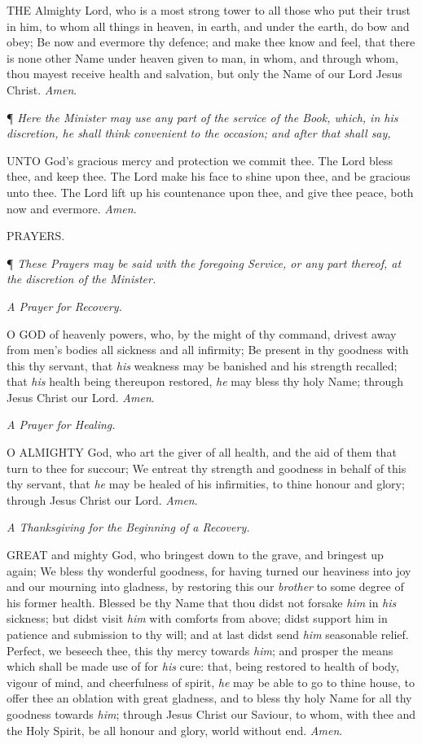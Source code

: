 THE
Almighty Lord, who is a most strong tower to all those who put their
trust in him, to whom all things in heaven, in earth, and under the
earth, do bow and obey; Be now and evermore thy defence; and make thee
know and feel, that there is none other Name under heaven given to man,
in whom, and through whom, thou mayest receive health and salvation,
but only the Name of our Lord Jesus Christ. \emph{Amen}.

¶
\emph{Here the Minister may use any part of the service of the Book, which,
in his discretion, he shall think convenient to the occasion; and after
that shall say,}

UNTO
God's gracious mercy and protection we commit thee. The Lord bless thee,
and keep thee. The Lord make his face to shine upon thee, and be gracious
unto thee. The Lord lift up his countenance upon thee, and give thee
peace, both now and evermore. \emph{Amen}.

PRAYERS.

¶ \emph{These Prayers may be said with the foregoing Service, or any
part thereof, at the discretion of the Minister.}

\emph{A
Prayer for Recovery.}

O
GOD of heavenly powers, who, by the might of thy command, drivest away
from men's bodies all sickness and all infirmity; Be present in thy goodness
with this thy servant, that \emph{his} weakness may be banished and
his strength recalled; that \emph{his} health being thereupon restored,
\emph{he} may bless thy holy Name; through Jesus Christ our Lord. \emph{Amen}.

\emph{A
Prayer for Healing.}

O
ALMIGHTY God, who art the giver of all health, and the aid of them that
turn to thee for succour; We entreat thy strength and goodness in behalf
of this thy servant, that \emph{he} may be healed of his infirmities,
to thine honour and glory; through Jesus Christ our Lord. \emph{Amen}.

\emph{A
Thanksgiving for the Beginning of a Recovery.}

GREAT
and mighty God, who bringest down to the grave, and bringest up again;
We bless thy wonderful goodness, for having turned our heaviness into
joy and our mourning into gladness, by restoring this our \emph{brother}
to some degree of his former health. Blessed be thy Name that thou didst
not forsake \emph{him} in \emph{his} sickness; but didst visit \emph{him}
with comforts from above; didst support him in patience and submission
to thy will; and at last didst send \emph{him} seasonable relief. Perfect,
we beseech thee, this thy mercy towards \emph{him}; and prosper the
means which shall be made use of for \emph{his} cure: that, being restored
to health of body, vigour of mind, and cheerfulness of spirit, \emph{he}
may be able to go to thine house, to offer thee an oblation with great
gladness, and to bless thy holy Name for all thy goodness towards \emph{him};
through Jesus Christ our Saviour, to whom, with thee and the Holy Spirit,
be all honour and glory, world without end. \emph{Amen}.

